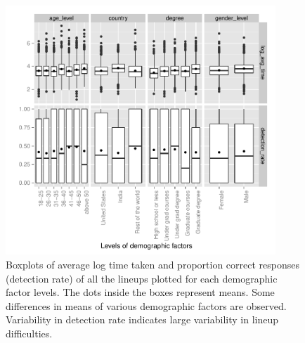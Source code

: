 \documentclass[10pt]{article}\usepackage[]{graphicx}\usepackage[]{color}
\newcommand{\dc}[1]{{\color{green} #1}}
\begin{document}

\begin{figure}[htbp] 
   \centering
   \includegraphics[width=4in]{demographic_effect.pdf} 
   \caption{Boxplots of average log time taken and proportion correct responses (detection rate) of all the lineups plotted for each demographic factor levels. The dots inside the boxes represent means. Some differences in means of various demographic factors are observed. Variability in detection rate indicates large variability in lineup difficulties. }
   \label{fig:demographic_effect}
\end{figure}



\end{document}
